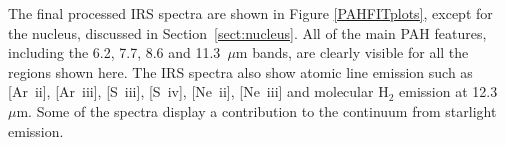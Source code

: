 
The final processed IRS spectra are shown in  Figure \ref{PAHFITplots}, except for the nucleus, discussed in Section~\ref{sect:nucleus}.
All of the main PAH features, including the 6.2, 7.7, 8.6 and 11.3~$\mu$m bands, 
are clearly visible for all the regions shown here.
The IRS spectra also show atomic line emission such as [Ar~{\sc ii}], [Ar~{\sc iii}], [S~{\sc iii}], [S~{\sc iv}], [Ne~{\sc ii}], [Ne~{\sc iii}] 
and molecular H$_{2}$ emission at 12.3~$\mu$m. Some of the spectra display a contribution to the continuum from starlight emission.


